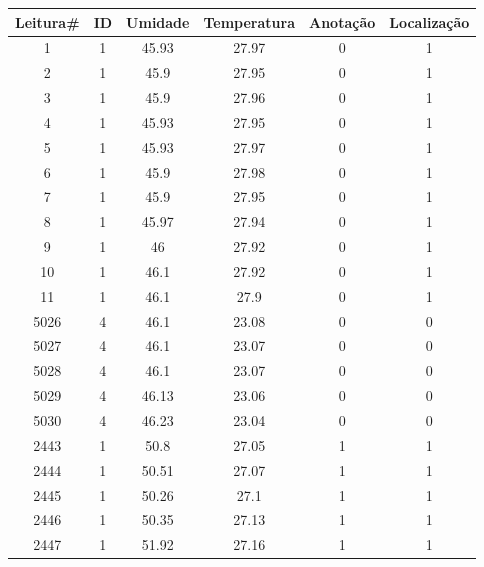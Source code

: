 \documentclass[cic,tc]{iiufrgs}
\begin{document}
\begin{table}[h]
\begin{center}
    \begin{tabular}{cccccc}
    \hline
    Leitura\# & ID & Umidade & Temperatura & Anotação & Localização \\
    \hline
    1 & 1 & 45.93 & 27.97 & 0 & 1 \\
    2 & 1 & 45.9 & 27.95 & 0 & 1 \\
    3 & 1 & 45.9 & 27.96 & 0 & 1 \\
    4 & 1 & 45.93 & 27.95 & 0 & 1 \\
    5 & 1 & 45.93 & 27.97 & 0 & 1 \\
    6 & 1 & 45.9 & 27.98 & 0 & 1 \\
    7 & 1 & 45.9 & 27.95 & 0 & 1 \\
    8 & 1 & 45.97 & 27.94 & 0 & 1 \\
    9 & 1 & 46 & 27.92 & 0 & 1 \\
    10 & 1 & 46.1 & 27.92 & 0 & 1 \\
    11 & 1 & 46.1 & 27.9 & 0 & 1 \\
    5026 & 4 & 46.1 & 23.08 & 0 & 0 \\
    5027 & 4 & 46.1 & 23.07 & 0 & 0 \\
    5028 & 4 & 46.1 & 23.07 & 0 & 0 \\
    5029 & 4 & 46.13 & 23.06 & 0 & 0 \\
    5030 & 4 & 46.23 & 23.04 & 0 & 0 \\
    2443 & 1 & 50.8 & 27.05 & 1 & 1 \\
    2444 & 1 & 50.51 & 27.07 & 1 & 1 \\
    2445 & 1 & 50.26 & 27.1 & 1 & 1 \\
    2446 & 1 & 50.35 & 27.13 & 1 & 1 \\
    2447 & 1 & 51.92 & 27.16 & 1 & 1 \\
    \hline
    \end{tabular}
    \end{center}
    \bigskip

\end{table}
\end{document}
